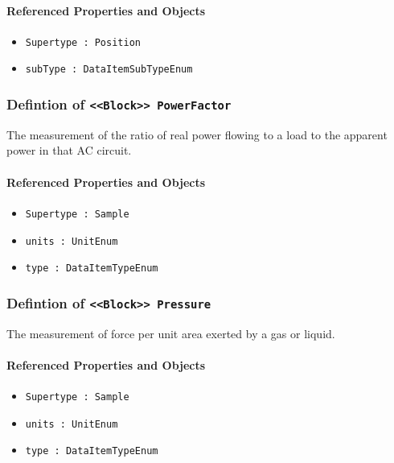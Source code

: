 \FloatBarrier
\paragraph{Referenced Properties and Objects}

\begin{itemize}
\item \texttt{Supertype : Position}

\item \texttt{subType : DataItemSubTypeEnum}

\end{itemize}
\FloatBarrier
\subsubsection{Defintion of \texttt{<<Block>> PowerFactor}}
  \label{type:PowerFactor}

\FloatBarrier

The measurement of the ratio of real power flowing to a load to the apparent power in that AC circuit.

\FloatBarrier
\paragraph{Referenced Properties and Objects}

\begin{itemize}
\item \texttt{Supertype : Sample}

\item \texttt{units : UnitEnum}

\item \texttt{type : DataItemTypeEnum}

\end{itemize}
\FloatBarrier
\subsubsection{Defintion of \texttt{<<Block>> Pressure}}
  \label{type:Pressure}

\FloatBarrier

The measurement of force per unit area exerted by a gas or liquid.

\FloatBarrier
\paragraph{Referenced Properties and Objects}

\begin{itemize}
\item \texttt{Supertype : Sample}

\item \texttt{units : UnitEnum}

\item \texttt{type : DataItemTypeEnum}

\end{itemize}
\FloatBarrier
